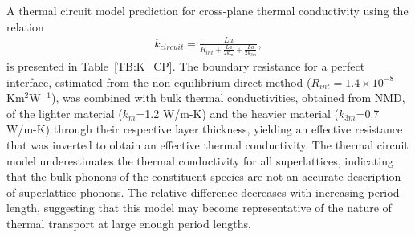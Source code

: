 \documentclass[aps,prb,preprint,preprintnumbers,amsmath,amssymb,floatfix,superscriptaddress]{revtex4}
\begin{document}
A thermal circuit model prediction for cross-plane thermal conductivity using the relation
\begin{equation}\label{EQ:TCircuit}
\begin{split}
k_{circuit}= \frac{La}{R_{int}+\frac{La}{2k_m}+\frac{La}{2k_{3m}}},
\end{split}
\end{equation}
is presented in Table~\ref{TB:K_CP}. The boundary resistance for a perfect interface, estimated from the non-equilibrium direct method ($R_{int}=1.4\times10^{-8}$ Km$^2$W$^{-1}$), was combined with bulk thermal conductivities, obtained from NMD, of the lighter material ($k_{m}$=1.2 W/m-K) and the heavier material ($k_{3m}$=0.7 W/m-K) through their respective layer thickness, yielding an effective resistance that was inverted to obtain an effective thermal conductivity. The thermal circuit model underestimates the thermal conductivity for all superlattices, indicating that the bulk phonons of the constituent species are not an accurate description of superlattice phonons. The relative difference decreases with increasing period length, suggesting that this model may become representative of the nature of thermal transport at large enough period lengths.
\end{document}
